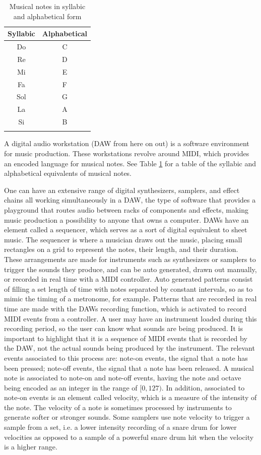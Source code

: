 \documentclass[12pt, a4paper, hidelinks]{article}
\begin{document}
 		\begin{longtable}[]{@{}cc@{}}
 			Syllabic & Alphabetical \tabularnewline
 			\midrule
 			Do  & C \tabularnewline
 			Re  & D \tabularnewline
 			Mi  & E \tabularnewline
 			Fa  & F \tabularnewline
 			Sol & G \tabularnewline
 			La  & A \tabularnewline
 			Si  & B \tabularnewline
 			\caption{Musical notes in syllabic and alphabetical form}
 			\label{table:notes}
 		\end{longtable}
 	A digital audio workstation (DAW from here on out) is a software environment for music production. These workstations revolve around MIDI, which provides an encoded language for musical notes. See Table \ref{table:notes} for a table of the syllabic and alphabetical equivalents of musical notes. 
 	\par
 	
	One can have an extensive range of digital synthesizers, samplers, and effect chains all working simultaneously in a DAW, the type of software that provides a playground that routes audio between racks of components and effects, making music production a possibility to anyone that owns a computer. DAWs have an element called a sequencer, which serves as a sort of digital equivalent to sheet music. The sequencer is where a musician draws out the music, placing small rectangles on a grid to represent the notes, their length, and their duration. These arrangements are made for instruments such as synthesizers or samplers to trigger the sounds they produce, and can be auto generated, drawn out manually, or recorded in real time with a MIDI controller. Auto generated patterns consist of filling a set length of time with notes separated by constant intervals, so as to mimic the timing of a metronome, for example. Patterns that are recorded in real time are made with the DAWs recording function, which is activated to record MIDI events from a controller. A user may have an instrument loaded during this recording period, so the user can know what sounds are being produced. It is important to highlight that it is a sequence of MIDI events that is recorded by the DAW, not the actual sounds being produced by the instrument. The relevant events associated to this process are: note-on events, the signal that a note has been pressed; note-off events, the signal that a note has been released. A musical note is associated to note-on and note-off events, having the note and octave being encoded as an integer in the range of $[0, 127)$. In addition, associated to note-on events is an element called velocity, which is a measure of the intensity of the note. The velocity of a note is sometimes processed by instruments to generate softer or stronger sounds. Some samplers use note velocity to trigger a sample from a set, i.e. a lower intensity recording of a snare drum for lower velocities as opposed to a sample of a powerful snare drum hit when the velocity is a higher range.
 	\par
 	
\end{document}
